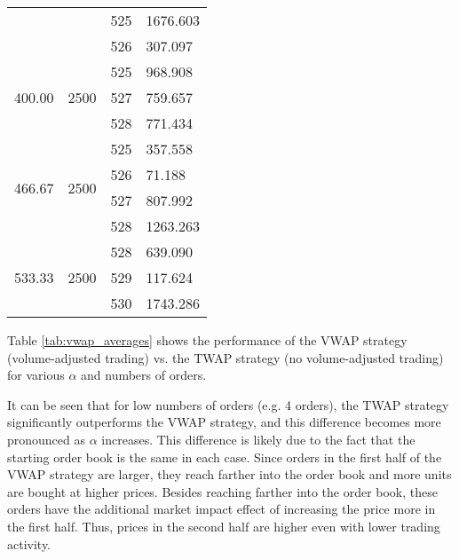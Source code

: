 \begin{table}[htbp]
\begin{center}
\begin{tabular}{l|l|l|l}
                        &                       & 525 & 1676.603 \\
                        &                       & 526 & 307.097  \\
\hline
\multirow{3}{*}{400.00} & \multirow{3}{*}{2500} & 525 & 968.908  \\
                        &                       & 527 & 759.657  \\
                        &                       & 528 & 771.434  \\
\hline
\multirow{4}{*}{466.67} & \multirow{4}{*}{2500} & 525 & 357.558  \\
                        &                       & 526 & 71.188   \\
                        &                       & 527 & 807.992  \\
                        &                       & 528 & 1263.263 \\
\hline
\multirow{3}{*}{533.33} & \multirow{3}{*}{2500} & 528 & 639.090  \\
                        &                       & 529 & 117.624  \\
                        &                       & 530 & 1743.286
\end{tabular}
\end{center}
\end{table}

Table \ref{tab:vwap_averages} shows the performance of the VWAP strategy (volume-adjusted trading) vs. the TWAP strategy (no volume-adjusted trading) for various $\alpha$ and numbers of orders. 

It can be seen that for low numbers of orders (e.g. 4 orders), the TWAP strategy significantly outperforms the VWAP strategy, and this difference becomes more pronounced as $\alpha$ increases. This difference is likely due to the fact that the starting order book is the same in each case. Since orders in the first half of the VWAP strategy are larger, they reach farther into the order book and more units are bought at higher prices. Besides reaching farther into the order book, these orders have the additional market impact effect of increasing the price more in the first half. Thus, prices in the second half are higher even with lower trading activity.

